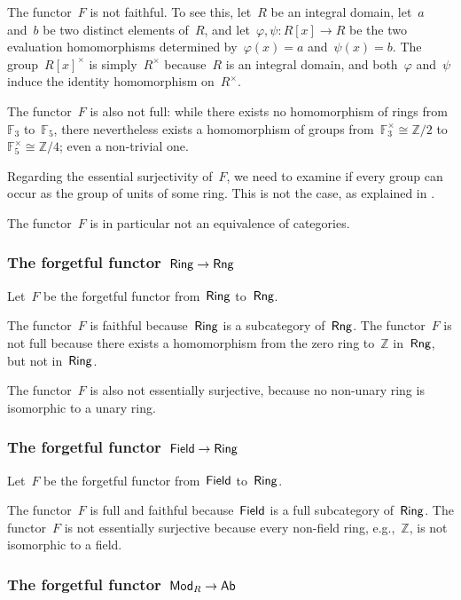 The functor~$F$ is not faithful.
To see this, let~$R$ be an integral domain, let~$a$ and~$b$ be two distinct elements of~$R$, and let~$φ, ψ \colon R[x] \to R$ be the two evaluation homomorphisms determined by~$φ(x) = a$ and~$ψ(x) = b$.
The group~$R[x]^×$ is simply~$R^×$ because~$R$ is an integral domain, and both~$φ$ and~$ψ$ induce the identity homomorphism on~$R^×$.

The functor~$F$ is also not full:
while there exists no homomorphism of rings from~$𝔽_3$ to~$𝔽_5$, there nevertheless exists a homomorphism of groups from~$𝔽_3^× ≅ ℤ/2$ to~$𝔽_5^× ≅ ℤ/4$;
even a non-trivial one.

Regarding the essential surjectivity of~$F$, we need to examine if every group can occur as the group of units of some ring.
This is not the case, as explained in \autocite{stackexchange_groups_of_units_of_rings}.

The functor~$F$ is in particular not an equivalence of categories.



\subsubsection*{The forgetful functor~$\mathsf{Ring} \to \mathsf{Rng}$}

Let~$F$ be the forgetful functor from~$\mathsf{Ring}$ to~$\mathsf{Rng}$.

The functor~$F$ is faithful because~$\mathsf{Ring}$ is a subcategory of~$\mathsf{Rng}$.
The functor~$F$ is not full because there exists a homomorphism from the zero ring to~$ℤ$ in~$\mathsf{Rng}$, but not in~$\mathsf{Ring}$.

The functor~$F$ is also not essentially surjective, because no non-unary ring is isomorphic to a unary ring.



\subsubsection*{The forgetful functor~$\mathsf{Field} \to \mathsf{Ring}$}

Let~$F$ be the forgetful functor from~$\mathsf{Field}$ to~$\mathsf{Ring}$.

The functor~$F$ is full and faithful because~$\mathsf{Field}$ is a full subcategory of~$\mathsf{Ring}$.
The functor~$F$ is not essentially surjective because every non-field ring, e.g.,~$ℤ$, is not isomorphic to a field.



\subsubsection*{The forgetful functor~$\mathsf{Mod}_R \to \mathsf{Ab}$}

